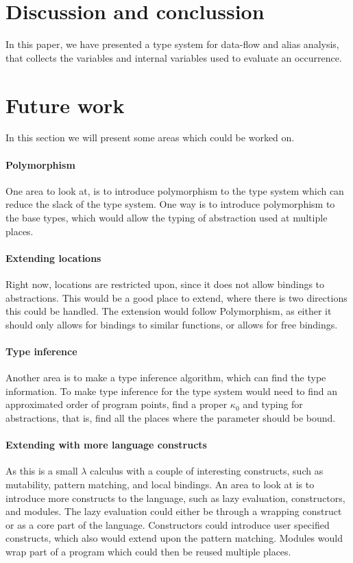 \documentclass[../../master.tex]{subfiles}
\begin{document}
\section{Discussion and conclussion}\label{sec:Conc}
In this paper, we have presented a type system for data-flow and alias analysis, that collects the variables and internal variables used to evaluate an occurrence.
\section{Future work}\label{sec:FW}
In this section we will present some areas which could be worked on.

\paragraph{Polymorphism}
One area to look at, is to introduce polymorphism to the type system which can reduce the slack of the type system.
One way is to introduce polymorphism to the base types, which would allow the typing of abstraction used at multiple places.

\paragraph{Extending locations}
Right now, locations are restricted upon, since it does not allow bindings to abstractions.
This would be a good place to extend, where there is two directions this could be handled.
The extension would follow Polymorphism, as either it should only allows for bindings to similar functions, or allows for free bindings.

\paragraph{Type inference}
Another area is to make a type inference algorithm, which can find the type information.
To make type inference for the type system would need to find an approximated order of program points, find a proper $\kappa_0$ and typing for abstractions, that is, find all the places where the parameter should be bound.

\paragraph{Extending with more language constructs}
As this is a small $\lambda$ calculus with a couple of interesting constructs, such as mutability, pattern matching, and local bindings.
An area to look at is to introduce more constructs to the language, such as lazy evaluation, constructors, and modules.
The lazy evaluation could either be through a wrapping construct or as a core part of the language.
Constructors could introduce user specified constructs, which also would extend upon the pattern matching.
Modules would wrap part of a program which could then be reused multiple places.
\end{document}
